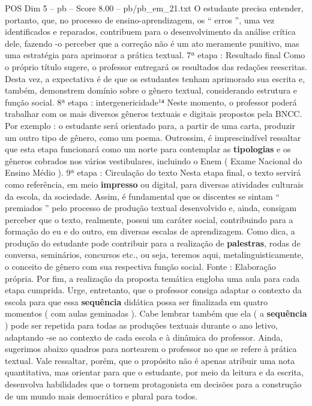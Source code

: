\begin{textsample}{POS Dim 5 – pb – Score 8.00 – pb/pb\_em\_21.txt}
O estudante precisa entender, portanto, que, no processo de ensino-aprendizagem, os “ erros ”, uma vez identificados e reparados, contribuem para o desenvolvimento da análise crítica dele, fazendo -o perceber que a correção não é um ato meramente punitivo, mas uma estratégia para aprimorar a prática textual. 7ª etapa : Resultado final Como o próprio título sugere, o professor entregará os resultados das redações reescritas.
Desta vez, a expectativa é de que os estudantes tenham aprimorado sua escrita e, também, demonstrem domínio sobre o gênero textual, considerando estrutura e função social. 8ª etapa : intergenericidade¹⁴ Neste momento, o professor poderá trabalhar com os mais diversos gêneros textuais e digitais propostos pela BNCC.
Por exemplo : o estudante será orientado para, a partir de uma carta, produzir um outro tipo de gênero, como um poema.
Outrossim, é imprescindível ressaltar que esta etapa funcionará como um norte para contemplar as \textbf{tipologias} e os gêneros cobrados nos vários vestibulares, incluindo o Enem ( Exame Nacional do Ensino Médio ). 9ª etapa : Circulação do texto Nesta etapa final, o texto servirá como referência, em meio \textbf{impresso} ou digital, para diversas atividades culturais da escola, da sociedade.
Assim, é fundamental que os discentes se sintam “ premiados ” pelo processo de produção textual desenvolvido e, ainda, consigam perceber que o texto, realmente, possui um caráter social, contribuindo para a formação do eu e do outro, em diversas escalas de aprendizagem.
Como dica, a produção do estudante pode contribuir para a realização de \textbf{palestras}, rodas de conversa, seminários, concursos etc., ou seja, teremos aqui, metalinguisticamente, o conceito de gênero com sua respectiva função social.
Fonte : Elaboração própria.
Por fim, a realização da proposta temática engloba uma aula para cada etapa cumprida.
Urge, entretanto, que o professor consiga adaptar o contexto da escola para que essa \textbf{sequência} didática possa ser finalizada em quatro momentos ( com aulas geminadas ).
Cabe lembrar também que ela ( a \textbf{sequência} ) pode ser repetida para todas as produções textuais durante o ano letivo, adaptando -se ao contexto de cada escola e à dinâmica do professor.
Ainda, sugerimos abaixo quadros para nortearem o professor no que se refere à prática textual.
Vale ressaltar, porém, que o propósito não é apenas atribuir uma nota quantitativa, mas orientar para que o estudante, por meio da leitura e da escrita, desenvolva habilidades que o tornem protagonista em decisões para a construção de um mundo mais democrático e plural para todos.

\end{textsample}
